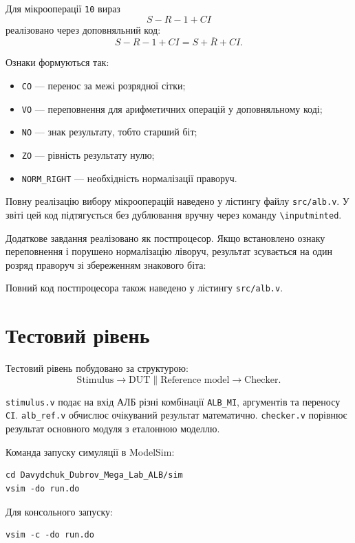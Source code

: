 \documentclass[12pt,a4paper]{article}
\begin{document}
Для мікрооперації \texttt{10} вираз
\[
S - R - 1 + CI
\]
реалізовано через доповняльний код:
\[
S - R - 1 + CI = S + \overline{R} + CI.
\]

Ознаки формуються так:
\begin{itemize}
    \item \texttt{CO} --- перенос за межі розрядної сітки;
    \item \texttt{VO} --- переповнення для арифметичних операцій у доповняльному коді;
    \item \texttt{NO} --- знак результату, тобто старший біт;
    \item \texttt{ZO} --- рівність результату нулю;
    \item \texttt{NORM\_RIGHT} --- необхідність нормалізації праворуч.
\end{itemize}

Повну реалізацію вибору мікрооперацій наведено у лістингу файлу \texttt{src/alb.v}. У звіті цей код підтягується без дублювання вручну через команду \texttt{\textbackslash inputminted}.

Додаткове завдання реалізовано як постпроцесор. Якщо встановлено ознаку переповнення і порушено нормалізацію ліворуч, результат зсувається на один розряд праворуч зі збереженням знакового біта:

Повний код постпроцесора також наведено у лістингу \texttt{src/alb.v}.

\section*{Тестовий рівень}

Тестовий рівень побудовано за структурою:
\[
\text{Stimulus} \rightarrow \text{DUT} \parallel \text{Reference model} \rightarrow \text{Checker}.
\]

\texttt{stimulus.v} подає на вхід АЛБ різні комбінації \texttt{ALB\_MI}, аргументів та переносу \texttt{CI}. \texttt{alb\_ref.v} обчислює очікуваний результат математично. \texttt{checker.v} порівнює результат основного модуля з еталонною моделлю.

Команда запуску симуляції в ModelSim:

\begin{verbatim}
cd Davydchuk_Dubrov_Mega_Lab_ALB/sim
vsim -do run.do
\end{verbatim}

Для консольного запуску:

\begin{verbatim}
vsim -c -do run.do
\end{verbatim}
\end{document}
